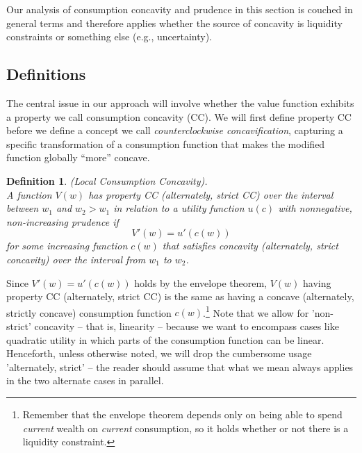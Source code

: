 \documentclass[titlepage]{\econtex}
\newtheorem{defn}{Definition}
\begin{document}
Our analysis of consumption concavity and prudence in this section is couched in general terms and therefore applies whether the source of concavity is liquidity constraints or something else (e.g., uncertainty).  %




\subsection{Definitions}
The central issue in our approach will involve whether the value function exhibits a property we call consumption concavity (CC). We will first define property CC before we define a concept we call \textit{counterclockwise concavification}, capturing a specific transformation of a consumption function that makes the modified function globally ``more'' concave.

\begin{defn}\label{defn:IntervalStrictCC} (Local Consumption Concavity). \\ A function $V(w)$ has property CC (alternately, strict CC) over the
	interval between $w_{1}$ and $w_{2}>w_{1}$ in relation to a
	utility function $u(c)$ with nonnegative, non-increasing prudence if
	\[
	V'(w) = u'(c(w))
	\]
	for some increasing function $c(w)$ that satisfies concavity (alternately, strict concavity) over the interval from $w_{1}$ to $w_{2}$.
\end{defn}
Since $V'(w) = u'(c(w))$ holds by the envelope theorem, $V(w)$ having property CC (alternately, strict CC) is the same as having a concave (alternately, strictly concave) consumption function $c(w)$.\footnote{Remember that the envelope theorem depends only on being able to spend \textit{current} wealth on \textit{current} consumption, so it holds whether or not there is a 	liquidity constraint.} Note that we allow for 'non-strict' concavity -- that is, linearity -- because we want to encompass cases like quadratic utility in which parts of the consumption function can be linear.  Henceforth, unless otherwise noted, we will drop the cumbersome usage 'alternately, strict' -- the reader should assume that what we mean always applies in the two alternate cases in parallel.
\end{document}
